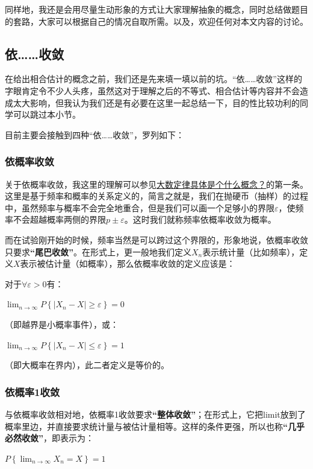 \documentclass[10pt, a4paper]{article}
\begin{document}
同样地，我还是会用尽量生动形象的方式让大家理解抽象的概念，同时总结做题目的套路，大家可以根据自己的情况自取所需。以及，欢迎任何对本文内容的讨论。

\subsection{依……收敛}

在给出相合估计的概念之前，我们还是先来填一填以前的坑。“依……收敛”这样的字眼肯定令不少人头疼，虽然这对于理解之后的不等式、相合估计等内容并不会造成太大影响，但我认为我们还是有必要在这里一起总结一下，目的性比较功利的同学可以跳过本小节。\par
目前主要会接触到四种“依……收敛”，罗列如下：
\subsubsection*{依概率收敛}
关于依概率收敛，我这里的理解可以参见\href{https://www.zhihu.com/question/19911209/answer/876481176}{大数定律具体是个什么概念？}的第一条。这里是基于频率和概率的关系定义的，简言之就是，我们在抛硬币（抽样）的过程中，虽然频率与概率不会完全地重合，但是我们可以画一个足够小的界限$\varepsilon$，使频率不会超越概率两侧的界限$p \pm \varepsilon$。这时我们就称频率依概率收敛为概率。\par
而在试验刚开始的时候，频率当然是可以跨过这个界限的，形象地说，依概率收敛只要求\textbf{“尾巴收敛”}。在形式上，更一般地我们定义$X_{n}$表示统计量（比如频率），定义$X$表示被估计量（如概率），那么依概率收敛的定义应该是：\par
对于$\forall \varepsilon > 0$有：
\begin{center}
    $\lim _{n \rightarrow \infty} P\left\{\left|X_{n}-X\right| \geq \varepsilon\right\}=0$
\end{center} \par
（即越界是小概率事件），或：
\begin{center}
    $\lim _{n \rightarrow \infty} P\left\{\left|X_{n}-X\right| \leq \varepsilon\right\}=1$
\end{center} \par
（即大概率在界内），此二者定义是等价的。



\subsubsection*{依概率1收敛}
与依概率收敛相对地，依概率1收敛要求\textbf{“整体收敛”}；在形式上，它把limit放到了概率里边，并直接要求统计量与被估计量相等。这样的条件更强，所以也称\textbf{“几乎必然收敛”}，即表示为：
\begin{center}
    $ P\left\{\lim _{n \rightarrow \infty}X_{n}=X \right\}=1$
\end{center}
\end{document}
